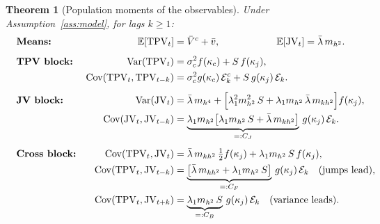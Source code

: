 \documentclass[11pt]{report}
\newtheorem{theorem}{Theorem}[chapter]
\theoremstyle{definition}
\theoremstyle{remark}
\newcommand{\E}{\mathbb{E}}
\newcommand{\Var}{\operatorname{Var}}
\newcommand{\Cov}{\operatorname{Cov}}
\newcommand{\TPV}{\mathrm{TPV}}
\newcommand{\JV}{\mathrm{JV}}
\newcommand{\mh}{m_{h^{2}}}
\newcommand{\mhh}{m_{h^{4}}}
\newcommand{\mkh}{m_{kh^{2}}}
\begin{document}
\begin{theorem}[Population moments of the observables]\label{thm:moments}
Under Assumption~\ref{ass:model}, for lags $k\ge1$:
\begin{align}
&\textbf{Means:}&
\E[\TPV_{t}]&=\bar V^{c}+\bar v, &
\E[\JV_{t}]&=\bar\lambda\,\mh . \label{eq:means}\\[1ex]
&\textbf{TPV block:}&
\Var(\TPV_{t})&=\sigma_{c}^{2}f(\kappa_{c})+S\,f(\kappa_{j}),\hspace{-4em} && \label{eq:vartpv}\\
&&\Cov(\TPV_{t},\TPV_{t-k})&=\sigma_{c}^{2}g(\kappa_{c})\,\mathcal{E}^{c}_{k}
+S\,g(\kappa_{j})\,\mathcal{E}_{k}. \hspace{-4em}&&\label{eq:acovtpv}\\[1ex]
&\textbf{JV block:}&
\Var(\JV_{t})&=\bar\lambda\,\mhh
+\Big[\lambda_{1}^{2}\mh^{2}\,S+\lambda_{1}\mh\,\bar\lambda\,\mkh\Big]f(\kappa_{j}),
\hspace{-10em}&&\label{eq:varjv}\\
&&\Cov(\JV_{t},\JV_{t-k})&=
\underbrace{\lambda_{1}\mh\big[\lambda_{1}\mh\,S+\bar\lambda\,\mkh\big]}_{=:C_{J}}
\,g(\kappa_{j})\,\mathcal{E}_{k}. \hspace{-10em}&&\label{eq:acovjv}\\[1ex]
&\textbf{Cross block:}&
\Cov(\TPV_{t},\JV_{t})&=\bar\lambda\,\mkh\,\tfrac{1}{2}f(\kappa_{j})
+\lambda_{1}\mh\,S\,f(\kappa_{j}), \hspace{-10em}&&\label{eq:cross0}\\
&&\Cov(\TPV_{t},\JV_{t-k})&=
\underbrace{\big[\bar\lambda\,\mkh+\lambda_{1}\mh\,S\big]}_{=:C_{F}}
\,g(\kappa_{j})\,\mathcal{E}_{k}
\quad\text{(jumps lead),}\hspace{-12em}&&\label{eq:crossfwd}\\
&&\Cov(\TPV_{t},\JV_{t+k})&=
\underbrace{\lambda_{1}\mh\,S}_{=:C_{B}}
\,g(\kappa_{j})\,\mathcal{E}_{k}
\quad\text{(variance leads).}\hspace{-12em}&&\label{eq:crossbwd}
\end{align}
\end{theorem}
\end{document}
